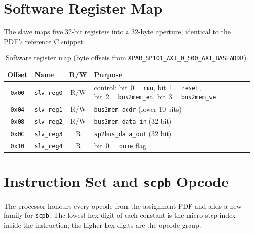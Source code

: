 \documentclass[11pt,letterpaper]{article}
\begin{document}
\section{Software Register Map}

The slave maps five 32-bit registers into a 32-byte aperture, identical
to the PDF's reference C snippet:

\begin{table}[H]
    \centering
    \caption{Software register map (byte offsets from
             \texttt{XPAR\_SP101\_AXI\_0\_S00\_AXI\_BASEADDR}).}
    \label{tab:regs}
    \small
    \begin{tabular}{clcp{8.0cm}}
        \toprule
        \textbf{Offset} & \textbf{Name} & \textbf{R/W} & \textbf{Purpose} \\
        \midrule
        \texttt{0x00} & \texttt{slv\_reg0} & R/W &
            control: bit~0~=\texttt{run}, bit~1~=\texttt{reset},
            bit~2~=\texttt{bus2mem\_en}, bit~3~=\texttt{bus2mem\_we} \\
        \texttt{0x04} & \texttt{slv\_reg1} & R/W &
            \texttt{bus2mem\_addr} (lower 10 bits) \\
        \texttt{0x08} & \texttt{slv\_reg2} & R/W &
            \texttt{bus2mem\_data\_in} (32 bit) \\
        \texttt{0x0C} & \texttt{slv\_reg3} & R   &
            \texttt{sp2bus\_data\_out} (32 bit) \\
        \texttt{0x10} & \texttt{slv\_reg4} & R   &
            bit~0 = \texttt{done} flag \\
        \bottomrule
    \end{tabular}
\end{table}

\section{Instruction Set and \texttt{scpb} Opcode}

The processor honours every opcode from the assignment PDF and adds a
new family for \texttt{scpb}. The lowest hex digit of each constant is
the micro-step index inside the instruction; the higher hex digits are
the opcode group.
\end{document}
